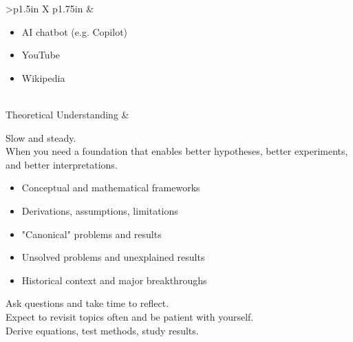 \documentclass[8pt]{extarticle}
\begin{document}
\begin{tabularx}{\linewidth}{>{\bfseries}p{1.5in} X p{1.75in}}
                                                            &   \begin{minipage}[t]{\linewidth}
                                                                \begin{itemize}[nosep,leftmargin=*]
                                                                    \item AI chatbot (e.g. Copilot)
                                                                    \item YouTube
                                                                    \item Wikipedia
                                                                \end{itemize}
                                                                \end{minipage}
                                                                        \\
    \addlinespace
    Theoretical Understanding   &   \begin{minipage}[t]{\linewidth}
                                    Slow and steady. \\
                                    When you need a foundation that enables better
                                    hypotheses, better experiments, and better interpretations.\vspace{0.5em}
                                    \begin{itemize}[nosep]
                                        \item Conceptual and mathematical frameworks
                                        \item Derivations, assumptions, limitations
                                        \item "Canonical" problems and results
                                        \item Unsolved problems and unexplained results
                                        \item Historical context and major breakthroughs
                                    \end{itemize} \vspace{0.5em}
                                    Ask questions and take time to reflect. \\
                                    Expect to revisit topics often and be patient with yourself. \\
                                    Derive equations, test methods, study results.
                                    \end{minipage}
                                    

\end{tabularx}
\end{document}
